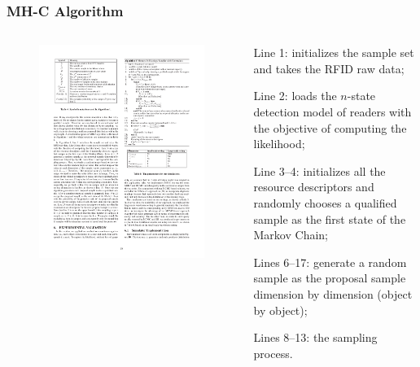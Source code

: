
\begin{frame}
\frametitle{MH-C Algorithm}

\begin{columns}[c]

\begin{figure}[tb]
  \includegraphics[width=\columnwidth]{figures/3-1/3-1-12.pdf}
\end{figure}

\begin{sitemize}
  \item Line 1: initializes the sample set and takes the RFID raw data;
  \item Line 2: loads the $n$-state detection model of readers with the objective of computing the likelihood;
  \item Line 3--4: initializes all the resource descriptors and randomly chooses a qualified sample as the first state of the Markov Chain;
  \item Lines 6--17: generate a random sample as the proposal sample dimension by dimension (object by object);
  \item Lines 8--13: the sampling process.
\end{sitemize}

\end{columns}

\end{frame}
